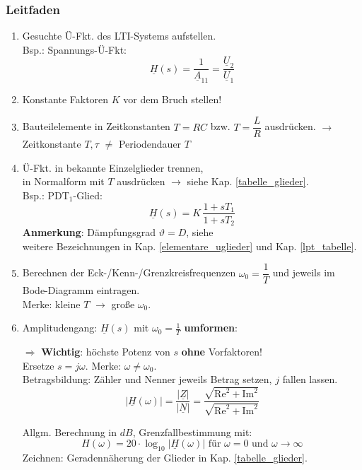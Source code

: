  \subsubsection{Leitfaden}
 \begin{enumerate}
 	\item Gesuchte Ü-Fkt. des LTI-Systems aufstellen.\\
 	Bsp.: Spannungs-Ü-Fkt: $$\underline{H}(s)=\frac{1}{\underline{A}_{11}} = \frac{\underline{U}_2}{\underline{U}_1}$$
 	
 	\item Konstante Faktoren $K$ vor dem Bruch stellen!
 	\item Bauteilelemente in Zeitkonstanten $T=RC$ bzw.  $T=\dfrac{L}{R}$ ausdrücken. {\small $\rightarrow$ Zeitkonstante $T, \tau$ $\neq $ Periodendauer $T$}
 	\item Ü-Fkt. in bekannte Einzelglieder trennen, \\in Normalform mit $T$ ausdrücken $\rightarrow$ siehe Kap. \ref{tabelle_glieder}.\\
 	Bsp.: PDT$_1$-Glied: $$\underline{H}(s)=K\,\frac{1+sT_1}{1+sT_2}$$
 	\textbf{Anmerkung}: Dämpfungsgrad $\vartheta=D$, siehe\\ weitere Bezeichnungen in Kap. \ref{elementare_uglieder} und Kap. \ref{lpt_tabelle}.
 	\item Berechnen der Eck-/Kenn-/Grenzkreisfrequenzen $\omega_0 = \dfrac{1}{T}$ und jeweils im Bode-Diagramm eintragen.\\
 	\small{Merke: kleine $T$ $\rightarrow$ große $\omega_0$}.
 	
 	\item Amplitudengang:
 	$\underline{H}(s)$ mit $\omega_0=\frac{1}{T}$ \textbf{umformen}:
 	
 	$\Rightarrow$ \textbf{Wichtig}: höchste Potenz von $s$ \textbf{ohne} Vorfaktoren!\\
 	Ersetze $s=j\omega$. \quad Merke:  $\omega\neq\omega_0$.\\
 	
  	Betragsbildung: Zähler und Nenner jeweils Betrag setzen, $j$ fallen lassen.
 	$$ |\underline{H}(\omega)| = \frac{|\underline{Z}|}{|\underline{N}|} = \frac{\sqrt{\text{Re}^2+\text{Im}^2}}{\sqrt{\text{Re}^2+\text{Im}^2}} $$
 	
 	Allgm. Berechnung in $dB$, Grenzfallbestimmung mit: 
 	$$H(\omega) = 20\cdot\log_{10}|\underline{H}(\omega)| \text{ für }\omega=0 \text{ und } \omega \rightarrow \infty $$
 	Zeichnen: Geradennäherung der Glieder in Kap. \ref{tabelle_glieder}.\\
 	

\end{enumerate}
